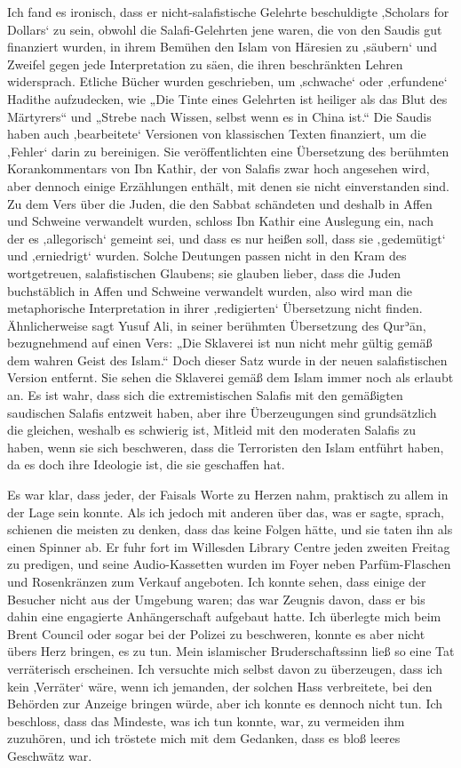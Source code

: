 \documentclass[12pt]{memoir}
\def\´{ʾ} %
\def \Quran{Qur\-\´ān} %
\def\–{\hskip0pt-\hskip0pt}
\begin{document}
Ich fand es ironisch,
dass er nicht\–salafistische Gelehrte beschuldigte
‚Scholars for Dollars‘ zu sein,
obwohl die Salafi\–Gelehrten jene waren,
die von den Saudis gut finanziert wurden,
in ihrem Bemühen den Islam von Häresien zu ‚säubern‘
und Zweifel gegen jede Interpretation zu säen,
die ihren beschränkten Lehren widersprach.
Etliche Bücher wurden geschrieben,
um ‚schwache‘ oder ‚erfundene‘ Hadithe aufzudecken, wie
„Die Tinte eines Gelehrten ist heiliger als das Blut des Märtyrers“
und „Strebe nach Wissen, selbst wenn es in China ist.“
Die Saudis haben auch ‚bearbeitete‘ Versionen
von klassischen Texten finanziert, um die ‚Fehler‘ darin zu bereinigen.
Sie veröffentlichten eine Übersetzung
des berühmten Korankommentars von Ibn Kathir,
der von Salafis zwar hoch angesehen wird,
aber dennoch einige Erzählungen enthält,
mit denen sie nicht einverstanden sind.
Zu dem Vers über die Juden, die den Sabbat schändeten
und deshalb in Affen und Schweine verwandelt wurden,
schloss Ibn Kathir eine Auslegung ein,
nach der es ‚allegorisch‘ gemeint sei,
und dass es nur heißen soll,
dass sie ‚gedemütigt‘ und ‚erniedrigt‘ wurden.
Solche Deutungen passen nicht in den Kram
des wortgetreuen, salafistischen Glaubens;
sie glauben lieber, dass die Juden buchstäblich
in Affen und Schweine verwandelt wurden,
also wird man die metaphorische Interpretation
in ihrer ‚redigierten‘ Übersetzung nicht finden.
Ähnlicherweise sagt Yusuf Ali,
in seiner berühmten Übersetzung des \Quran,
bezugnehmend auf einen Vers:
„Die Sklaverei ist nun nicht mehr gültig gemäß dem wahren Geist des Islam.“
Doch dieser Satz wurde in der neuen salafistischen Version entfernt.
Sie sehen die Sklaverei gemäß dem Islam immer noch als erlaubt an.
Es ist wahr, dass sich die extremistischen Salafis
mit den gemäßigten saudischen Salafis entzweit haben,
aber ihre Überzeugungen sind grundsätzlich die gleichen,
weshalb es schwierig ist, Mitleid mit den moderaten Salafis zu haben,
wenn sie sich beschweren, dass die Terroristen den Islam entführt haben,
da es doch ihre Ideologie ist, die sie geschaffen hat.

Es war klar, dass jeder, der Faisals Worte zu Herzen nahm,
praktisch zu allem in der Lage sein konnte.
Als ich jedoch mit anderen über das, was er sagte, sprach,
schienen die meisten zu denken, dass das keine Folgen hätte,
und sie taten ihn als einen Spinner ab.
Er fuhr fort im Willesden Library Centre jeden zweiten Freitag zu predigen,
und seine Audio\–Kassetten wurden im Foyer
neben Parfüm\–Flaschen und Rosenkränzen zum Verkauf angeboten.
Ich konnte sehen, dass einige der Besucher nicht aus der Umgebung waren;
das war Zeugnis davon, dass er bis dahin
eine engagierte Anhängerschaft aufgebaut hatte.
Ich überlegte mich beim Brent Council oder sogar bei der Polizei zu beschweren,
konnte es aber nicht übers Herz bringen, es zu tun.
Mein islamischer Bruderschaftssinn
ließ so eine Tat verräterisch erscheinen.
Ich versuchte mich selbst davon zu überzeugen,
dass ich kein ‚Verräter‘ wäre,
wenn ich jemanden, der solchen Hass verbreitete,
bei den Behörden zur Anzeige bringen würde,
aber ich konnte es dennoch nicht tun.
Ich beschloss, dass das Mindeste, was ich tun konnte, war,
zu vermeiden ihm zuzuhören,
und ich tröstete mich mit dem Gedanken,
dass es bloß leeres Geschwätz war.
\end{document}
